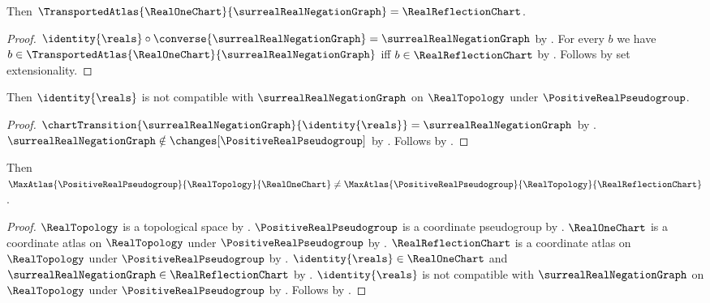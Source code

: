 \begin{theorem}\label{real_reflection_transported_atlas}
    Then $\TransportedAtlas{\RealOneChart}{\surrealRealNegationGraph}=\RealReflectionChart$.
\end{theorem}
\begin{proof}
    $\identity{\reals}\circ\converse{\surrealRealNegationGraph}=\surrealRealNegationGraph$ by
        .
    For every $b$ we have $b\in\TransportedAtlas{\RealOneChart}{\surrealRealNegationGraph}$ iff
        $b\in\RealReflectionChart$ by
        .
    Follows by set extensionality.
\end{proof}

\begin{theorem}\label{real_identity_reflection_incompatible}
    Then $\identity{\reals}$ is not compatible with $\surrealRealNegationGraph$
        on $\RealTopology$ under $\PositiveRealPseudogroup$.
\end{theorem}
\begin{proof}
    $\chartTransition{\surrealRealNegationGraph}{\identity{\reals}}
        =\surrealRealNegationGraph$ by .
    $\surrealRealNegationGraph\notin\changes[\PositiveRealPseudogroup]$ by
        .
    Follows by .
\end{proof}

\begin{theorem}\label{real_positive_max_atlases_differ}
    Then $\MaxAtlas{\PositiveRealPseudogroup}{\RealTopology}{\RealOneChart}
        \neq\MaxAtlas{\PositiveRealPseudogroup}{\RealTopology}{\RealReflectionChart}$.
\end{theorem}
\begin{proof}
    $\RealTopology$ is a topological space by .
    $\PositiveRealPseudogroup$ is a coordinate pseudogroup by .
    $\RealOneChart$ is a coordinate atlas on $\RealTopology$ under $\PositiveRealPseudogroup$
        by .
    $\RealReflectionChart$ is a coordinate atlas on $\RealTopology$ under $\PositiveRealPseudogroup$
        by .
    $\identity{\reals}\in\RealOneChart$ and $\surrealRealNegationGraph\in\RealReflectionChart$
        by .
    $\identity{\reals}$ is not compatible with $\surrealRealNegationGraph$ on
        $\RealTopology$ under $\PositiveRealPseudogroup$ by
        .
    Follows by .
\end{proof}

